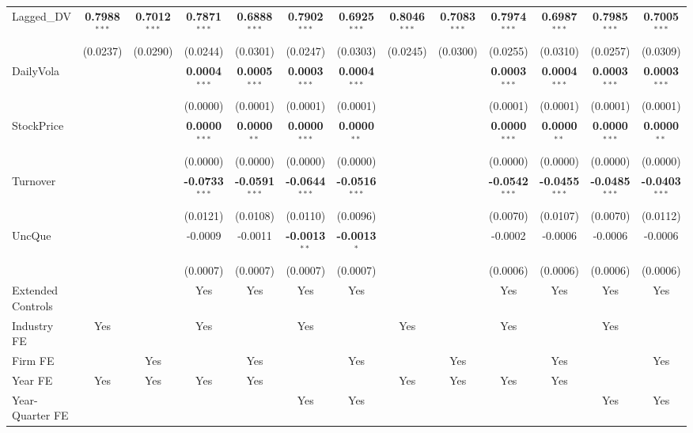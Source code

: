 \begin{landscape}
\begin{table}[H]
\begin{tabular}{lcccccccccccc}
Lagged\_DV & \textbf{0.7988}$^{***}$ & \textbf{0.7012}$^{***}$ & \textbf{0.7871}$^{***}$ & \textbf{0.6888}$^{***}$ & \textbf{0.7902}$^{***}$ & \textbf{0.6925}$^{***}$ & \textbf{0.8046}$^{***}$ & \textbf{0.7083}$^{***}$ & \textbf{0.7974}$^{***}$ & \textbf{0.6987}$^{***}$ & \textbf{0.7985}$^{***}$ & \textbf{0.7005}$^{***}$ \\
 & (0.0237) & (0.0290) & (0.0244) & (0.0301) & (0.0247) & (0.0303) & (0.0245) & (0.0300) & (0.0255) & (0.0310) & (0.0257) & (0.0309) \\
DailyVola &  &  & \textbf{0.0004}$^{***}$ & \textbf{0.0005}$^{***}$ & \textbf{0.0003}$^{***}$ & \textbf{0.0004}$^{***}$ &  &  & \textbf{0.0003}$^{***}$ & \textbf{0.0004}$^{***}$ & \textbf{0.0003}$^{***}$ & \textbf{0.0003}$^{***}$ \\
 &  &  & (0.0000) & (0.0001) & (0.0001) & (0.0001) &  &  & (0.0001) & (0.0001) & (0.0001) & (0.0001) \\
StockPrice &  &  & \textbf{0.0000}$^{***}$ & \textbf{0.0000}$^{**}$ & \textbf{0.0000}$^{***}$ & \textbf{0.0000}$^{**}$ &  &  & \textbf{0.0000}$^{***}$ & \textbf{0.0000}$^{**}$ & \textbf{0.0000}$^{***}$ & \textbf{0.0000}$^{**}$ \\
 &  &  & (0.0000) & (0.0000) & (0.0000) & (0.0000) &  &  & (0.0000) & (0.0000) & (0.0000) & (0.0000) \\
Turnover &  &  & \textbf{-0.0733}$^{***}$ & \textbf{-0.0591}$^{***}$ & \textbf{-0.0644}$^{***}$ & \textbf{-0.0516}$^{***}$ &  &  & \textbf{-0.0542}$^{***}$ & \textbf{-0.0455}$^{***}$ & \textbf{-0.0485}$^{***}$ & \textbf{-0.0403}$^{***}$ \\
 &  &  & (0.0121) & (0.0108) & (0.0110) & (0.0096) &  &  & (0.0070) & (0.0107) & (0.0070) & (0.0112) \\
UncQue &  &  & -0.0009 & -0.0011 & \textbf{-0.0013}$^{**}$ & \textbf{-0.0013}$^{*}$ &  &  & -0.0002 & -0.0006 & -0.0006 & -0.0006 \\
 &  &  & (0.0007) & (0.0007) & (0.0007) & (0.0007) &  &  & (0.0006) & (0.0006) & (0.0006) & (0.0006) \\
\midrule
Extended Controls &  &  & Yes & Yes & Yes & Yes &  &  & Yes & Yes & Yes & Yes \\
Industry FE & Yes &  & Yes &  & Yes &  & Yes &  & Yes &  & Yes &  \\
Firm FE &  & Yes &  & Yes &  & Yes &  & Yes &  & Yes &  & Yes \\
Year FE & Yes & Yes & Yes & Yes &  &  & Yes & Yes & Yes & Yes &  &  \\
Year-Quarter FE &  &  &  &  & Yes & Yes &  &  &  &  & Yes & Yes \\

\end{tabular}
\end{table}
\end{landscape}

